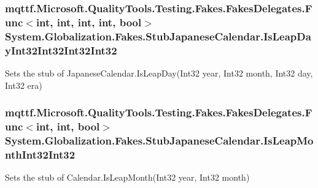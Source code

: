 \hypertarget{class_system_1_1_globalization_1_1_fakes_1_1_stub_japanese_calendar_a888ce1efbdca23c53fd5fa60f9382a2c}{
\subsubsection[{Is\-Leap\-Day\-Int32\-Int32\-Int32\-Int32}]{\setlength{\rightskip}{0pt plus 5cm}mqttf.\-Microsoft.\-Quality\-Tools.\-Testing.\-Fakes.\-Fakes\-Delegates.\-Func$<$int, int, int, int, bool$>$ System.\-Globalization.\-Fakes.\-Stub\-Japanese\-Calendar.\-Is\-Leap\-Day\-Int32\-Int32\-Int32\-Int32}}\label{class_system_1_1_globalization_1_1_fakes_1_1_stub_japanese_calendar_a888ce1efbdca23c53fd5fa60f9382a2c}


Sets the stub of Japanese\-Calendar.\-Is\-Leap\-Day(\-Int32 year, Int32 month, Int32 day, Int32 era)

\hypertarget{class_system_1_1_globalization_1_1_fakes_1_1_stub_japanese_calendar_afbcf74ee6431e073de34449b118b2b35}{
\subsubsection[{Is\-Leap\-Month\-Int32\-Int32}]{\setlength{\rightskip}{0pt plus 5cm}mqttf.\-Microsoft.\-Quality\-Tools.\-Testing.\-Fakes.\-Fakes\-Delegates.\-Func$<$int, int, bool$>$ System.\-Globalization.\-Fakes.\-Stub\-Japanese\-Calendar.\-Is\-Leap\-Month\-Int32\-Int32}}\label{class_system_1_1_globalization_1_1_fakes_1_1_stub_japanese_calendar_afbcf74ee6431e073de34449b118b2b35}


Sets the stub of Calendar.\-Is\-Leap\-Month(\-Int32 year, Int32 month)

